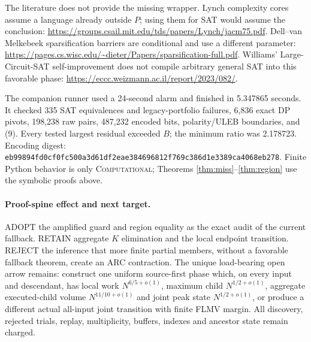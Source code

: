 \documentclass[11pt]{article}
\begin{document}
The literature does not provide the missing wrapper.  Lynch complexity
cores assume a language already outside $P$; using them for SAT would assume
the conclusion: \url{https://groups.csail.mit.edu/tds/papers/Lynch/jacm75.pdf}.
Dell--van Melkebeek sparsification barriers are conditional and use a
different parameter: \url{https://pages.cs.wisc.edu/~dieter/Papers/sparsification-full.pdf}.
Williams' Large-Circuit-SAT self-improvement does not compile arbitrary
general SAT into this favorable phase:
\url{https://eccc.weizmann.ac.il/report/2023/082/}.

The companion runner used a 24-second alarm and finished in 5.347865 seconds.
It checked 335 SAT equivalences and legacy-portfolio failures, 6,836 exact
DP pivots, 198,238 raw pairs, 487,232 encoded bits, polarity/ULEB boundaries,
and (9).  Every tested largest residual exceeded $B$; the minimum ratio was
2.178723.  Encoding digest:
\texttt{eb99894fd0cf0fc500a3d61df2eae384696812f769c386d1e3389ca4068eb278}.
Finite Python behavior is only \textsc{Computational}; Theorems
\ref{thm:miss}--\ref{thm:region} use the symbolic proofs above.

\paragraph{Proof-spine effect and next target.}
ADOPT the amplified guard and region equality as the exact audit of the
current fallback.  RETAIN aggregate $K$ elimination and the local endpoint
transition.  REJECT the inference that more finite partial members, without
a favorable fallback theorem, create an ARC contraction.  The unique
load-bearing open arrow remains: construct one uniform source-first phase
which, on every input and descendant, has local work $N^{6/5+o(1)}$, maximum
child $N^{1/2+o(1)}$, aggregate executed-child volume $N^{11/10+o(1)}$ and
joint peak state $N^{1/2+o(1)}$, or produce a different actual all-input
joint transition with finite FLMV margin.  All discovery, rejected trials,
replay, multiplicity, buffers, indexes and ancestor state remain charged.

\end{document}
